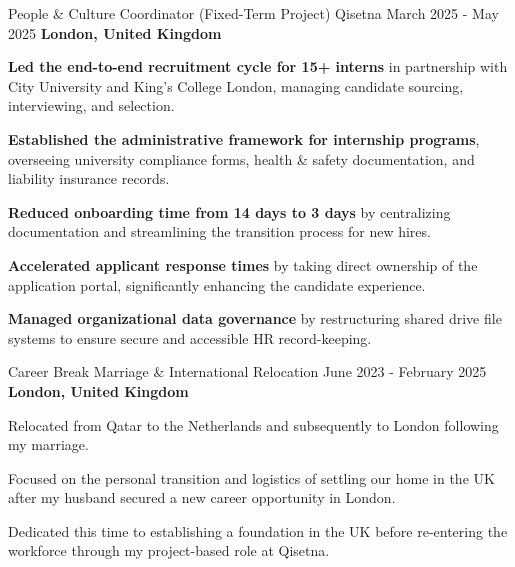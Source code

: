 
\begin{cventries}
    \cventry
    {People \& Culture Coordinator (Fixed-Term Project)} %
    {Qisetna} %
    {March 2025 - May 2025} %
    {\textbf{London, United Kingdom}} %
    {
        \begin{cvitems}
            \item \textbf{Led the end-to-end recruitment cycle for 15+ interns} in partnership with City University and King’s College London, managing candidate sourcing, interviewing, and selection.
            \item \textbf{Established the administrative framework for internship programs}, overseeing university compliance forms, health \& safety documentation, and liability insurance records.
            \item \textbf{Reduced onboarding time from 14 days to 3 days} by centralizing documentation and streamlining the transition process for new hires.
            \item \textbf{Accelerated applicant response times} by taking direct ownership of the application portal, significantly enhancing the candidate experience.
            \item \textbf{Managed organizational data governance} by restructuring shared drive file systems to ensure secure and accessible HR record-keeping.
        \end{cvitems}
    }

    \cventry
    {Career Break} %
    {Marriage \& International Relocation} %
    {June 2023 - February 2025} %
    {\textbf{London, United Kingdom}} %
    {
        \begin{cvitems}
            \item Relocated from Qatar to the Netherlands and subsequently to London following my marriage. 
            \item Focused on the personal transition and logistics of settling our home in the UK after my husband secured a new career opportunity in London. 
            \item Dedicated this time to establishing a foundation in the UK before re-entering the workforce through my project-based role at Qisetna. 
        \end{cvitems}
    }


\end{cventries}
